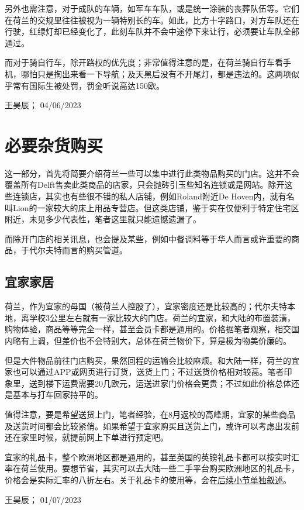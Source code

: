 另外也需注意，对于成队的车辆，如军车车队，或是统一涂装的丧葬队伍等。它们在荷兰的交规里往往被视为一辆特别长的车。如此，比方十字路口，对方车队还在行驶，红绿灯却已经变化了，此刻车队并不会中途停下来让行，必须要让车队全部通过。

而对于骑自行车，除开路权的优先度；非常值得注意的是，在荷兰骑自行车看手机，哪怕只是掏出来看一下导航；及天黑后没有不开尾灯，都是违法的。这两项似乎常有国际生被处罚，罚金听说高达150欧。
\begin{flushright}
王昊辰； 04/06/2023
\end{flushright}

\vspace{\betsubsec} %
\section{必要杂货购买}
这一部分，首先将简要介绍荷兰一些可以集中进行此类物品购买的门店。这并不会覆盖所有Delft售卖此类商品的店家，只会抛砖引玉些知名连锁或是网站。除开这些连锁店，其实也有些很不错的私人店铺，例如Roland附近De Hoven内，就有名叫Lion的一家较大的床上用品专营店。但这类店铺，鉴于实在仅便利于特定住宅区附近，未见多少代表性，笔者这里就只能遗憾遗漏了。

而除开门店的相关讯息，也会提及某些，例如中餐调料等于华人而言或许重要的商品，于代尔夫特而言的购买管道。

\subsection{宜家家居}
荷兰，作为宜家的母国（被荷兰人控股了），宜家密度还是比较高的；代尔夫特本地，离学校3公里左右就有一家比较大的门店。荷兰的宜家，和大陆的布置装潢，购物体验，商品等等完全一样，甚至会员卡都是通用的。价格据笔者观察，相交国内略有上调，但差价也不会特别大，总体在荷兰物价下，算是极为物美价廉的。

但是大件物品前往门店购买，果然回程的运输会比较麻烦。和大陆一样，荷兰的宜家也可以通过APP或网页进行订货，送货上门；不过送货价格相对较高。笔者印象里，送到楼下运费需要20几欧元，运送进家门价格会更贵；不过如此价格总体还是基本与打车回家持平的。

值得注意，要是希望送货上门，笔者经验，在8月返校的高峰期，宜家的某些商品及送货时间都会比较紧俏。如果希望于宜家购买且送货上门，或许可以考虑出发前还在家里时候，就提前网上下单进行预定吧。

宜家的礼品卡，整个欧洲地区都是通用的，甚至英国的英镑礼品卡都可以按实时汇率在荷兰使用。要想节省，其实可以去大陆一些二手平台购买欧洲地区的礼品卡，价格会是实际汇率的八折左右。关于礼品卡的使用等，会在\hyperlink{礼品卡}{\uline{后续小节单独叙述}}。
\begin{flushright}
王昊辰； 01/07/2023
\end{flushright}

